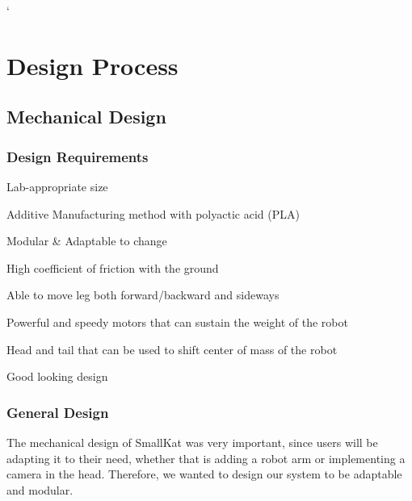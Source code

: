`\section{Design Process} %


    \subsection{Mechanical Design} 

        \subsubsection{Design Requirements}
            \begin{Deliverables}
                \item Lab-appropriate size
                \item Additive Manufacturing method with polyactic acid (PLA)
                \item Modular \& Adaptable to change
                \item High coefficient of friction with the ground
                \item Able to move leg both forward/backward and sideways
                \item Powerful and speedy motors that can sustain the weight of the robot
                \item Head and tail that can be used to shift center of mass of the robot
                \item Good looking design
            \end{Deliverables}
        \subsubsection{General Design}
            The mechanical design of SmallKat was very important, since users will be adapting it to their need, whether that is adding a robot arm or implementing a camera in the head. Therefore, we wanted to design our system to be adaptable and modular.

